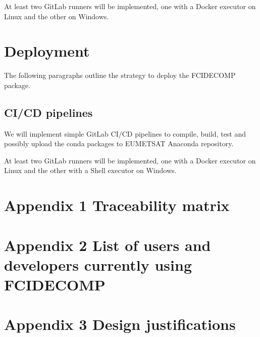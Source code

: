 \documentclass[a4paper,10pt,english]{sphinxmanual}
\begin{document}
\sphinxAtStartPar
At least two GitLab runners will be implemented, one with a Docker executor on Linux and the other on Windows.


\chapter{Deployment}
\label{\detokenize{deployment:deployment}}\label{\detokenize{deployment::doc}}
\sphinxAtStartPar
The following paragraphs outline the strategy to deploy the FCIDECOMP package.


\section{CI/CD pipelines}
\label{\detokenize{deployment:ci-cd-pipelines}}
\sphinxAtStartPar
We will implement simple GitLab CI/CD pipelines to compile, build, test and possibly upload the conda packages to
EUMETSAT Anaconda repository.

\sphinxAtStartPar
At least two GitLab runners will be implemented, one with a Docker executor on Linux and the other with a Shell
executor on Windows.


\chapter{Appendix 1 \sphinxhyphen{} Traceability matrix}
\label{\detokenize{a_traceability_matrix:appendix-1-traceability-matrix}}\label{\detokenize{a_traceability_matrix::doc}}

\chapter{Appendix 2 \sphinxhyphen{} List of users and developers currently using FCIDECOMP}
\label{\detokenize{a_users_using_fcidecomp:appendix-2-list-of-users-and-developers-currently-using-fcidecomp}}\label{\detokenize{a_users_using_fcidecomp::doc}}

\chapter{Appendix 3 \sphinxhyphen{} Design justifications}
\label{\detokenize{a_design_justifications:appendix-3-design-justifications}}\label{\detokenize{a_design_justifications::doc}}


\renewcommand{\indexname}{Index}
\printindex
\end{document}
